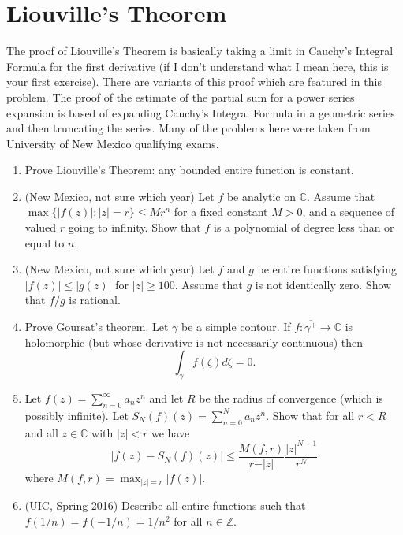 \documentclass[a4paper,10pt]{article}
\newcommand{\ZZ}{\mathbb{Z}}
\newcommand{\CC}{\mathbb{C}}
\begin{document}
\section{Liouville's Theorem}

The proof of Liouville's Theorem is basically taking a limit in Cauchy's Integral Formula for the first derivative (if I don't understand what I mean here, this is your first exercise). 
There are variants of this proof which are featured in this problem.
The proof of the estimate of the partial sum for a power series expansion is based of expanding Cauchy's Integral Formula in a geometric series and then truncating the series. 
Many of the problems here were taken from University of New Mexico qualifying exams.

\begin{enumerate}
	\item Prove Liouville's Theorem: any bounded entire function is constant. 

	\item (New Mexico, not sure which year) %
	Let $f$ be analytic on $\CC$. 
	Assume that $\max \lbrace \vert f(z) \vert : \vert z \vert = r \rbrace \leq M r^n$ for a fixed constant $M>0$, and a sequence of valued $r$ going to infinity. 
	Show that $f$ is a polynomial of degree less than or equal to $n$. 
	
	\item (New Mexico, not sure which year) 
	Let $f$ and $g$ be entire functions satisfying $\vert f(z) \vert \leq \vert g(z) \vert$ for $\vert z \vert \geq 100$. Assume that $g$ is not identically zero. Show that $f/g$ is rational. 
	
	\item Prove Goursat's theorem. Let $\gamma$ be a simple contour. If $f:\overline{\gamma^+} \to \CC$ is holomorphic (but whose derivative is not necessarily continuous) then 
	$$ \int_{\gamma} f(\zeta) d\zeta = 0. $$
	
	
	\item Let $f(z) = \sum_{n=0}^{\infty}a_nz^n$ and let $R$ be the radius of convergence (which is possibly infinite). Let $S_N(f)(z) = \sum_{n=0}^N a_n z^n$. 
	Show that for all $r<R$ and all $z \in \CC$ with $\vert z \vert < r$ we have 
	$$ \vert f(z) - S_N(f)(z) \vert \leq \frac{M(f,r)}{r - \vert z \vert} \frac{\vert z \vert^{N+1}}{r^{N}} $$ 
	where $ M(f,r) = \max_{\vert z \vert = r} \vert f(z) \vert. $
	
	\item (UIC, Spring 2016)
	Describe all entire functions such that $f(1/n) = f(-1/n) = 1/n^2$ for all $n\in \ZZ$.
	


\end{enumerate}
\end{document}
